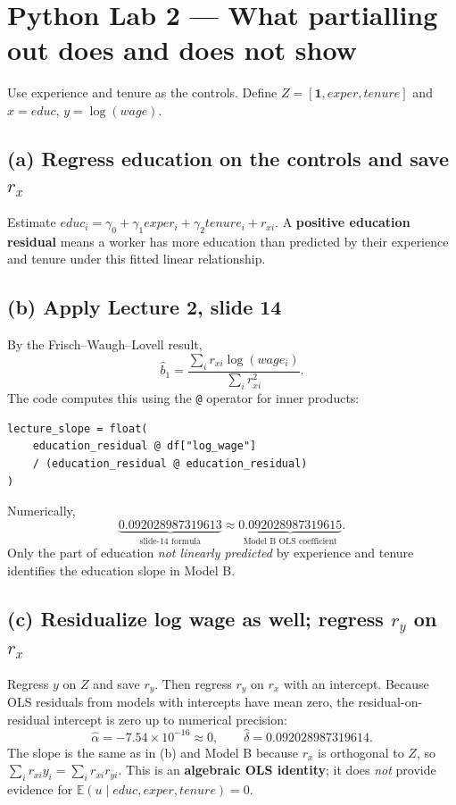 \documentclass[11pt,a4paper]{article}
\newcommand{\E}{\mathbb{E}}
\begin{document}
\section{Python Lab 2 --- What partialling out does and does not show}
Use experience and tenure as the controls. Define $Z=[\mathbf 1,exper,tenure]$ and $x=educ$, $y=\log(wage)$.

\subsection*{(a) Regress education on the controls and save $r_x$}
Estimate $educ_i=\gamma_0+\gamma_1 exper_i+\gamma_2 tenure_i+r_{xi}$. A \textbf{positive education residual} means a worker has more education than predicted by their experience and tenure under this fitted linear relationship.

\subsection*{(b) Apply Lecture 2, slide 14}
By the Frisch--Waugh--Lovell result,
\[
\boxed{\widehat b_1=\frac{\sum_i r_{xi}\log(wage_i)}{\sum_i r_{xi}^2}}.
\]
The code computes this using the \texttt{@} operator for inner products:
\begin{verbatim}
lecture_slope = float(
    education_residual @ df["log_wage"]
    / (education_residual @ education_residual)
)
\end{verbatim}
Numerically,
\[
\underbrace{0.092028987319613}_{\text{slide-14 formula}}
\approx \underbrace{0.092028987319615}_{\text{Model B OLS coefficient}}.
\]
Only the part of education \emph{not linearly predicted} by experience and tenure identifies the education slope in Model B.

\subsection*{(c) Residualize log wage as well; regress $r_y$ on $r_x$}
Regress $y$ on $Z$ and save $r_y$. Then regress $r_y$ on $r_x$ with an intercept. Because OLS residuals from models with intercepts have mean zero, the residual-on-residual intercept is zero up to numerical precision:
\[
\widehat\alpha=-7.54\times 10^{-16}\approx 0,\qquad
\widehat\delta=0.092028987319614.
\]
The slope is the same as in (b) and Model B because $r_x$ is orthogonal to $Z$, so $\sum_i r_{xi}y_i=\sum_i r_{xi}r_{yi}$. This is an \textbf{algebraic OLS identity}; it does \emph{not} provide evidence for $\E(u\mid educ,exper,tenure)=0$.
\end{document}
